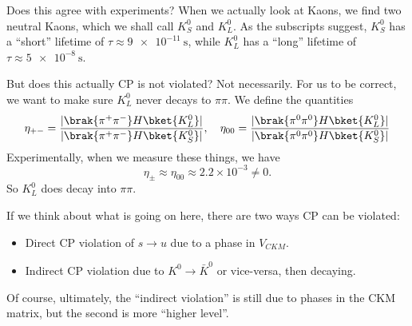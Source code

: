 \documentclass[a4paper]{article}
\begin{document}
Does this agree with experiments? When we actually look at Kaons, we find two neutral Kaons, which we shall call $K^0_S$ and $K_L^0$. As the subscripts suggest, $K^0_S$ has a ``short'' lifetime of $\tau \approx \SI{9e-11}{\second}$, while $K^0_L$ has a ``long'' lifetime of $\tau \approx \SI{5e-8}{\second}$.

But does this actually CP is not violated? Not necessarily. For us to be correct, we want to make sure $K_L^0$ never decays to $\pi\pi$. We define the quantities
\[
  \eta_{+ -} = \frac{|\brak{\pi^+ \pi^-}H \bket{K_L^0}|}{|\brak{\pi^+ \pi^-}H \bket{K_S^0}|},\quad \eta_{0 0} = \frac{|\brak{\pi^0 \pi^0}H \bket{K_L^0}|}{|\brak{\pi^0 \pi^0}H \bket{K_S^0}|}
\]
Experimentally, when we measure these things, we have
\[
  \eta_{\pm} \approx \eta_{00} \approx 2.2\times 10^{-3} \not= 0.
\]
So $K_L^0$ does decay into $\pi \pi$.

If we think about what is going on here, there are two ways CP can be violated:
\begin{itemize}
  \item Direct CP violation of $s \to u$ due to a phase in $V_{CKM}$. %
  \item Indirect CP violation due to $K^0 \to \bar{K}^0$ or vice-versa, then decaying.
\end{itemize}
Of course, ultimately, the ``indirect violation'' is still due to phases in the CKM matrix, but the second is more ``higher level''.
\end{document}
